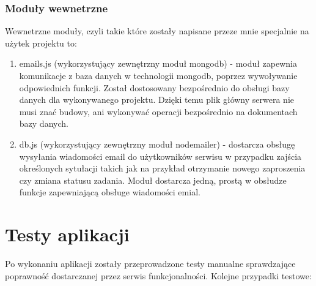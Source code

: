 \documentclass[12pt]{report}
\begin{document}
\subsection{Moduły wewnetrzne}
Wewnetrzne moduły, czyli takie które zostały napisane przeze mnie specjalnie na użytek projektu to:
\begin{enumerate}
\item emails.js (wykorzystujący zewnętrzny moduł mongodb) - moduł zapewnia komunikacje z baza danych w technologii mongodb, poprzez wywoływanie odpowiednich funkcji. 
Został dostosowany bezpośrednio do obsługi bazy danych dla wykonywanego projektu. 
Dzięki temu plik główny serwera nie musi znać budowy, ani wykonywać operacji bezpośrednio na dokumentach bazy danych.
\item db.js (wykorzystujący zewnętrzny moduł nodemailer) - dostarcza obsługę wysyłania wiadomości email do użytkowników serwisu w przypadku zajścia określonych sytułacji takich jak na przykład otrzymanie nowego zaproszenia czy zmiana statusu zadania. Moduł dostarcza jedną, prostą w obsłudze funkcje zapewniającą obsługe wiadomości emial. 
\end{enumerate}
 
\chapter{Testy aplikacji}

Po wykonaniu aplikacji zostały przeprowadzone testy manualne sprawdzające poprawność dostarczanej przez serwis funkcjonalności.
Kolejne przypadki testowe:
\end{document}
